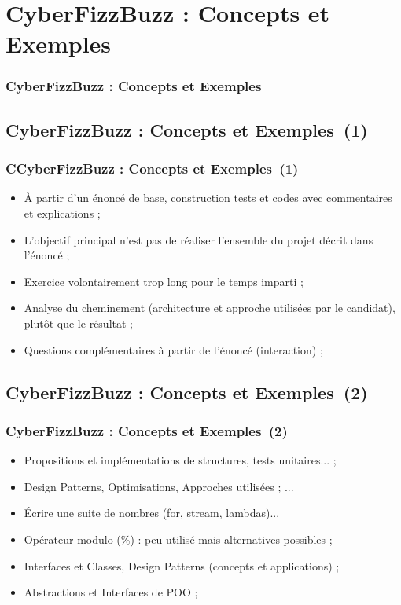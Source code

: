 \documentclass{beamer}
\begin{document}
\def\titleExemplesCyberFizzBuzz{CyberFizzBuzz : Concepts et Exemples}
\section{\titleExemplesCyberFizzBuzz }
\begin{frame}
	\frametitle{\titleExemplesCyberFizzBuzz }
	\tableofcontents[sections=3,currentsection,subsectionstyle=show/shaded/hide]
\end{frame} 

\subsection{\titleExemplesCyberFizzBuzz ~(1)}
\begin{frame}
	\frametitle{C\titleExemplesCyberFizzBuzz ~(1)}
	\begin{itemize}
		\item {\`A} partir d'un {\'e}nonc{\'e} de base, construction tests et codes avec commentaires et explications ; 
		\item L'objectif principal n'est pas de r{\'e}aliser l'ensemble du projet d{\'e}crit dans l'{\'e}nonc{\'e} ; 
		\item Exercice volontairement trop long pour le temps imparti ; 
		\item Analyse du cheminement (architecture et approche utilis{\'e}es par le candidat), plut{\^o}t que le r{\'e}sultat ;
		\item Questions compl{\'e}mentaires {\`a} partir de l'{\'e}nonc{\'e} (interaction) ; 
	\end{itemize}
\end{frame} 

\subsection{\titleExemplesCyberFizzBuzz ~(2)}
\begin{frame}
	\frametitle{\titleExemplesCyberFizzBuzz ~(2)}
	\begin{itemize}
		\item Propositions et impl{\'e}mentations de structures, tests unitaires... ;
		\item Design Patterns, Optimisations, Approches utilis{\'e}es ; ... 
		\item {\'E}crire une suite de nombres (for, stream, lambdas)...
		\item Op{\'e}rateur modulo (\%) : peu utilis{\'e} mais alternatives possibles ; 
		\item Interfaces et Classes, Design Patterns (concepts et applications) ; 
		\item Abstractions et Interfaces de POO ; 
	\end{itemize}
\end{frame} 
\end{document}
